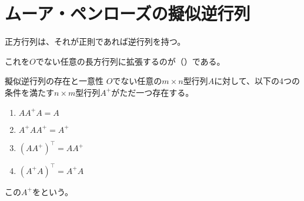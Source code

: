 \documentclass[../../../topic_linear-algebra]{subfiles}
\begin{document}
\sectionline
\section{ムーア・ペンローズの擬似逆行列}

正方行列は、それが正則であれば逆行列を持つ。

これを$O$でない任意の長方行列に拡張するのが（）である。

\begin{theorem*}{擬似逆行列の存在と一意性}
  $O$でない任意の$m \times n$型行列$A$に対して、以下の4つの条件を満たす$n \times m$型行列$A^+$がただ一つ存在する。
  \begin{enumerate}[label=\romanlabel]
    \item $AA^+A = A$
    \item $A^+AA^+ = A^+$
    \item $(AA^+)^\top = AA^+$
    \item $(A^+A)^\top = A^+A$
  \end{enumerate}
  この$A^+$をという。
\end{theorem*}
\end{document}
